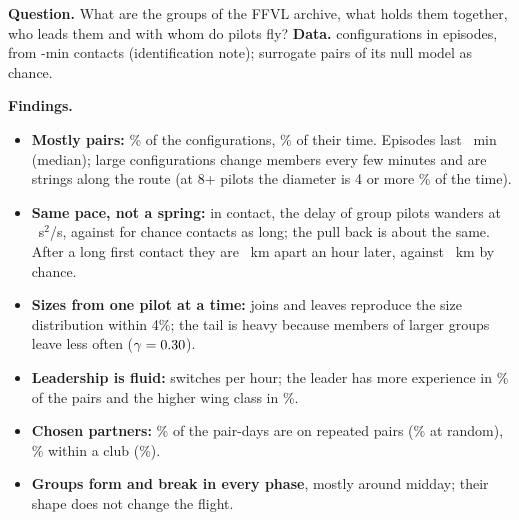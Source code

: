 \begin{summary}
\textbf{Question.} What are the groups of the FFVL archive, what holds them together, who leads them and with whom do pilots fly?
\textbf{Data.} \StConfigurations{} configurations in \StEpisodes{} episodes, from \tauStar-min contacts (identification note);
surrogate pairs of its null model as chance.

\textbf{Findings.}
\begin{itemize}
  \item \textbf{Mostly pairs:} \StPairsCount\% of the configurations, \StPairsTime\% of their time. Episodes last \StMedianEpisode~min (median);
        large configurations change members every few minutes and are strings along the route (at 8+ pilots the diameter is 4 or more
        \StDiamFourMax\% of the time).
  \item \textbf{Same pace, not a spring:} in contact, the delay of group pilots wanders at \StQReal~s$^2$/s, against \StQChanceLong{} for chance
        contacts as long; the pull back is about the same. After a long first contact they are \StSepRealLongSixty~km apart an hour later,
        against \StSepChanceLongSixty~km by chance.
  \item \textbf{Sizes from one pilot at a time:} joins and leaves reproduce the size distribution within 4\%; the tail is heavy because
        members of larger groups leave less often ($\gamma=0.30$).
  \item \textbf{Leadership is fluid:} \StSwitches{} switches per hour; the leader has more experience in \StExp\% of the pairs and the higher
        wing class in \StWing\%.
  \item \textbf{Chosen partners:} \StRepeatObs\% of the pair-days are on repeated pairs (\StRepeatNull\% at random), \StSameClubObs\% within a club
        (\StSameClubNull\%).
  \item \textbf{Groups form and break in every phase}, mostly around midday; their shape does not change the flight.
\end{itemize}
\end{summary}

